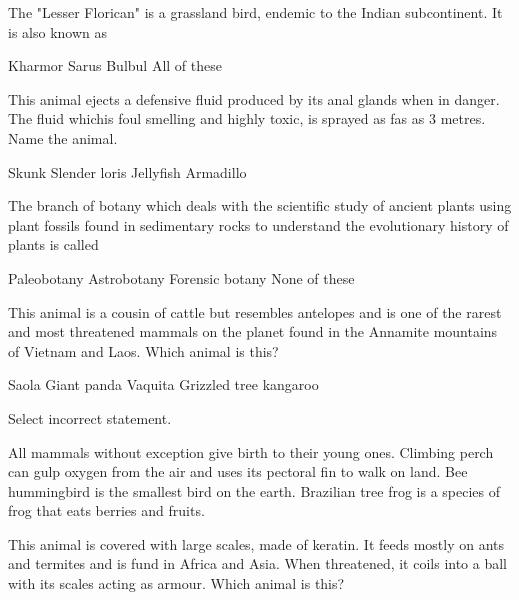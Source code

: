 \begin{questions}
\question The "Lesser Florican" is a grassland bird, endemic to the Indian subcontinent. It is also known as \fillin

\begin{randomizeoneparchoices}
    \CorrectChoice Kharmor
    \choice Sarus
    \choice Bulbul
    \choice All of these
\end{randomizeoneparchoices}

\question This animal ejects a defensive fluid produced by its anal glands when in danger. The fluid whichis foul smelling and highly toxic, is sprayed as fas as 3 metres. Name the animal.

\begin{randomizeoneparchoices}
    \CorrectChoice Skunk
    \choice Slender loris
    \choice Jellyfish
    \choice Armadillo
\end{randomizeoneparchoices}

\question The branch of botany which deals with the scientific study of ancient plants using plant fossils found in sedimentary rocks to understand the evolutionary history of plants is called \fillin

\begin{randomizeoneparchoices}
    \CorrectChoice Paleobotany
    \choice Astrobotany
    \choice Forensic botany
    \choice None of these
\end{randomizeoneparchoices}

\question This animal is a cousin of cattle but resembles antelopes and is one of the rarest and most threatened mammals on the planet found in the Annamite mountains of Vietnam and Laos. Which animal is this?

\begin{randomizeoneparchoices}
    \CorrectChoice Saola
    \choice Giant panda
    \choice Vaquita
    \choice Grizzled tree kangaroo
\end{randomizeoneparchoices}

\question Select incorrect statement.

\begin{randomizechoices}
    \CorrectChoice All mammals without exception give birth to their young ones.
    \choice Climbing perch can gulp oxygen from the air and uses its pectoral fin to walk on land.
    \choice Bee hummingbird is the smallest bird on the earth.
    \choice Brazilian tree frog is a species of frog that eats berries and fruits.
\end{randomizechoices}

\question This animal is covered with large scales, made of keratin. It feeds mostly on ants and termites and is fund in Africa and Asia. When threatened, it coils into a ball with its scales acting as armour. Which animal is this?


\end{questions}
